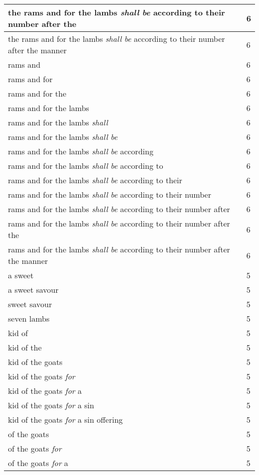 \begin{center}
\begin{longtable}{|p{3.0in}|p{0.5in}|}
the rams and for the lambs \emph{shall} \emph{be} according to their number after the & 6\\ \hline 
the rams and for the lambs \emph{shall} \emph{be} according to their number after the manner & 6\\ \hline 
rams and & 6\\ \hline 
rams and for & 6\\ \hline 
rams and for the & 6\\ \hline 
rams and for the lambs & 6\\ \hline 
rams and for the lambs \emph{shall} & 6\\ \hline 
rams and for the lambs \emph{shall} \emph{be} & 6\\ \hline 
rams and for the lambs \emph{shall} \emph{be} according & 6\\ \hline 
rams and for the lambs \emph{shall} \emph{be} according to & 6\\ \hline 
rams and for the lambs \emph{shall} \emph{be} according to their & 6\\ \hline 
rams and for the lambs \emph{shall} \emph{be} according to their number & 6\\ \hline 
rams and for the lambs \emph{shall} \emph{be} according to their number after & 6\\ \hline 
rams and for the lambs \emph{shall} \emph{be} according to their number after the & 6\\ \hline 
rams and for the lambs \emph{shall} \emph{be} according to their number after the manner & 6\\ \hline 
a sweet & 5\\ \hline 
a sweet savour & 5\\ \hline 
sweet savour & 5\\ \hline 
seven lambs & 5\\ \hline 
kid of & 5\\ \hline 
kid of the & 5\\ \hline 
kid of the goats & 5\\ \hline 
kid of the goats \emph{for} & 5\\ \hline 
kid of the goats \emph{for} a & 5\\ \hline 
kid of the goats \emph{for} a sin & 5\\ \hline 
kid of the goats \emph{for} a sin offering & 5\\ \hline 
of the goats & 5\\ \hline 
of the goats \emph{for} & 5\\ \hline 
of the goats \emph{for} a & 5\\ \hline 

\end{longtable}
\end{center}
